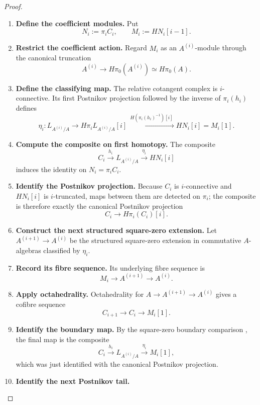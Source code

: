 \begin{proof}
\begin{enumerate}[label=\textup{(\arabic*)}]
\[    \]
    \item \textbf{Define the coefficient modules.}
    Put
    \[
        N_i:=\pi_iC_i,
        \qquad
        M_i:=HN_i[i-1].
    \]
    \item \textbf{Restrict the coefficient action.}
    Regard \(M_i\) as an \(A^{(i)}\)-module through the canonical truncation
    \[
        A^{(i)}\longrightarrow H\pi_0(A^{(i)})
        \simeq H\pi_0(A).
    \]
    \item \textbf{Define the classifying map.}
    The relative cotangent complex is \(i\)-connective. Its first Postnikov
    projection followed by the inverse of \(\pi_i(h_i)\) defines
    \[
        \eta_i:
        L_{A^{(i)}/A}
        \longrightarrow
        H\pi_iL_{A^{(i)}/A}[i]
        \xrightarrow{\ H(\pi_i(h_i)^{-1})[i]\ }
        HN_i[i]
        =M_i[1].
    \]
    \item \textbf{Compute the composite on first homotopy.}
    The composite
    \[
        C_i\xrightarrow{h_i}L_{A^{(i)}/A}
        \xrightarrow{\eta_i}HN_i[i]
    \]
    induces the identity on \(N_i=\pi_iC_i\).
    \item \textbf{Identify the Postnikov projection.}
    Because \(C_i\) is
    \(i\)-connective and \(HN_i[i]\) is \(i\)-truncated, maps between them are
    detected on \(\pi_i\); the composite is therefore exactly the canonical
    Postnikov projection
    \[
        C_i\longrightarrow H\pi_i(C_i)[i].
    \]
    \item \textbf{Construct the next structured square-zero extension.}
    Let \(A^{(i+1)}\to A^{(i)}\) be the structured square-zero extension in
    commutative \(A\)-algebras classified by \(\eta_i\).
    \item \textbf{Record its fibre sequence.}
    Its underlying fibre
    sequence is
    \[
        M_i\longrightarrow A^{(i+1)}\longrightarrow A^{(i)}.
    \]
    \item \textbf{Apply octahedrality.}
    Octahedrality for
    \(A\to A^{(i+1)}\to A^{(i)}\) gives a cofibre sequence
    \[
        C_{i+1}\longrightarrow C_i\longrightarrow M_i[1].
    \]
    \item \textbf{Identify the boundary map.}
    By the square-zero boundary comparison
    , the final map is the composite
    \[
        C_i\xrightarrow{h_i}L_{A^{(i)}/A}
        \xrightarrow{\eta_i}M_i[1],
    \]
    which was just identified with the canonical Postnikov projection.
    \item \textbf{Identify the next Postnikov tail.}

\end{enumerate}
\end{proof}
